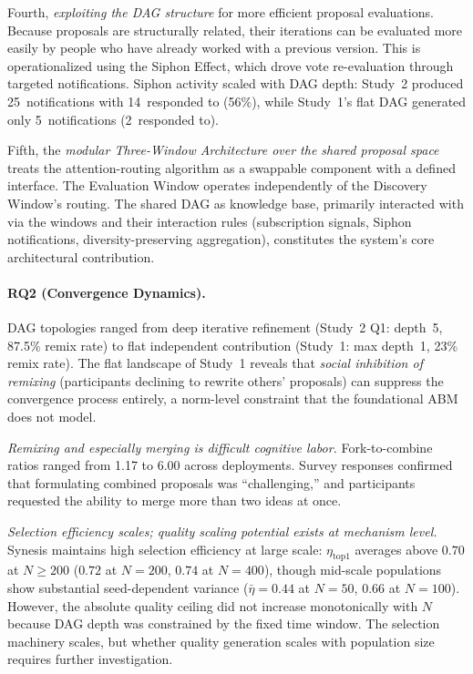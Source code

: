 \documentclass[a4paper, 12pt, twoside]{iviathesis}
\begin{document}
Fourth, \textit{exploiting the DAG structure} for more efficient proposal evaluations. Because proposals are structurally related, their iterations can be evaluated more easily by people who have already worked with a previous version. This is operationalized using the Siphon Effect, which drove vote re-evaluation through targeted notifications. Siphon activity scaled with DAG depth: Study~2 produced 25~notifications with 14~responded to (56\%), while Study~1's flat DAG generated only 5~notifications (2~responded to).


Fifth, the \textit{modular Three-Window Architecture over the shared proposal space} treats the attention-routing algorithm as a swappable component with a defined interface. The Evaluation Window operates independently of the Discovery Window's routing. The shared DAG as knowledge base, primarily interacted with via the windows and their interaction rules (subscription signals, Siphon notifications, diversity-preserving aggregation), constitutes the system's core architectural contribution.

\paragraph{RQ2 (Convergence Dynamics).}
DAG topologies ranged from deep iterative refinement (Study~2 Q1: depth~5, 87.5\% remix rate) to flat independent contribution (Study~1: max depth~1, 23\% remix rate). The flat landscape of Study~1 reveals that \textit{social inhibition of remixing} (participants declining to rewrite others' proposals) can suppress the convergence process entirely, a norm-level constraint that the foundational ABM does not model.

\textit{Remixing and especially merging is difficult cognitive labor.} Fork-to-combine ratios ranged from 1.17 to 6.00 across deployments. Survey responses confirmed that formulating combined proposals was ``challenging,'' and participants requested the ability to merge more than two ideas at once.

\textit{Selection efficiency scales; quality scaling potential exists at mechanism level.} Synesis maintains high selection efficiency at large scale: $\eta_{\text{top1}}$ averages above $0.70$ at $N \geq 200$ ($0.72$ at $N{=}200$, $0.74$ at $N{=}400$), though mid-scale populations show substantial seed-dependent variance ($\bar{\eta} = 0.44$ at $N{=}50$, $0.66$ at $N{=}100$).
However, the absolute quality ceiling did not increase monotonically with $N$ because DAG depth was constrained by the fixed time window. The selection machinery scales, but whether quality generation scales with population size requires further investigation.
\end{document}
